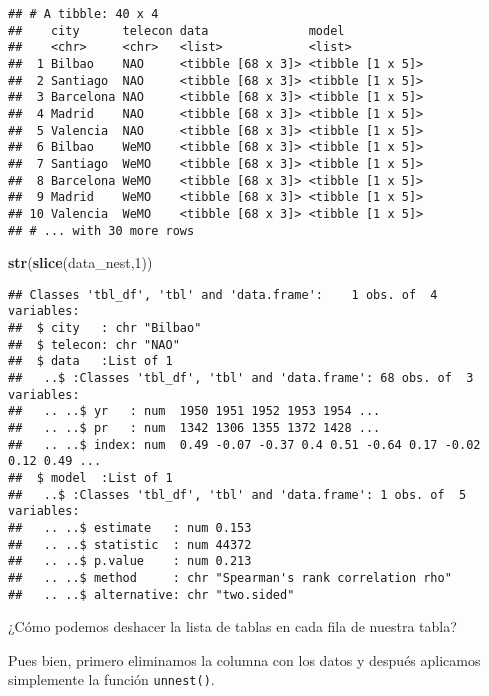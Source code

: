 \documentclass[]{article}
\newenvironment{Shaded}{\begin{snugshade}}{\end{snugshade}}
\newcommand{\KeywordTok}[1]{\textcolor[rgb]{0.13,0.29,0.53}{\textbf{#1}}}
\newcommand{\DecValTok}[1]{\textcolor[rgb]{0.00,0.00,0.81}{#1}}
\newcommand{\StringTok}[1]{\textcolor[rgb]{0.31,0.60,0.02}{#1}}
\newcommand{\OperatorTok}[1]{\textcolor[rgb]{0.81,0.36,0.00}{\textbf{#1}}}
\newcommand{\NormalTok}[1]{#1}
\begin{document}
\begin{verbatim}
## # A tibble: 40 x 4
##    city      telecon data              model           
##    <chr>     <chr>   <list>            <list>          
##  1 Bilbao    NAO     <tibble [68 x 3]> <tibble [1 x 5]>
##  2 Santiago  NAO     <tibble [68 x 3]> <tibble [1 x 5]>
##  3 Barcelona NAO     <tibble [68 x 3]> <tibble [1 x 5]>
##  4 Madrid    NAO     <tibble [68 x 3]> <tibble [1 x 5]>
##  5 Valencia  NAO     <tibble [68 x 3]> <tibble [1 x 5]>
##  6 Bilbao    WeMO    <tibble [68 x 3]> <tibble [1 x 5]>
##  7 Santiago  WeMO    <tibble [68 x 3]> <tibble [1 x 5]>
##  8 Barcelona WeMO    <tibble [68 x 3]> <tibble [1 x 5]>
##  9 Madrid    WeMO    <tibble [68 x 3]> <tibble [1 x 5]>
## 10 Valencia  WeMO    <tibble [68 x 3]> <tibble [1 x 5]>
## # ... with 30 more rows
\end{verbatim}

\begin{Shaded}
\begin{Highlighting}[]
\KeywordTok{str}\NormalTok{(}\KeywordTok{slice}\NormalTok{(data_nest,}\DecValTok{1}\NormalTok{))}
\end{Highlighting}
\end{Shaded}

\begin{verbatim}
## Classes 'tbl_df', 'tbl' and 'data.frame':    1 obs. of  4 variables:
##  $ city   : chr "Bilbao"
##  $ telecon: chr "NAO"
##  $ data   :List of 1
##   ..$ :Classes 'tbl_df', 'tbl' and 'data.frame': 68 obs. of  3 variables:
##   .. ..$ yr   : num  1950 1951 1952 1953 1954 ...
##   .. ..$ pr   : num  1342 1306 1355 1372 1428 ...
##   .. ..$ index: num  0.49 -0.07 -0.37 0.4 0.51 -0.64 0.17 -0.02 0.12 0.49 ...
##  $ model  :List of 1
##   ..$ :Classes 'tbl_df', 'tbl' and 'data.frame': 1 obs. of  5 variables:
##   .. ..$ estimate   : num 0.153
##   .. ..$ statistic  : num 44372
##   .. ..$ p.value    : num 0.213
##   .. ..$ method     : chr "Spearman's rank correlation rho"
##   .. ..$ alternative: chr "two.sided"
\end{verbatim}

¿Cómo podemos deshacer la lista de tablas en cada fila de nuestra tabla?

Pues bien, primero eliminamos la columna con los datos y después
aplicamos simplemente la función \texttt{unnest()}.

\begin{Shaded}
\end{Shaded}
\end{document}
